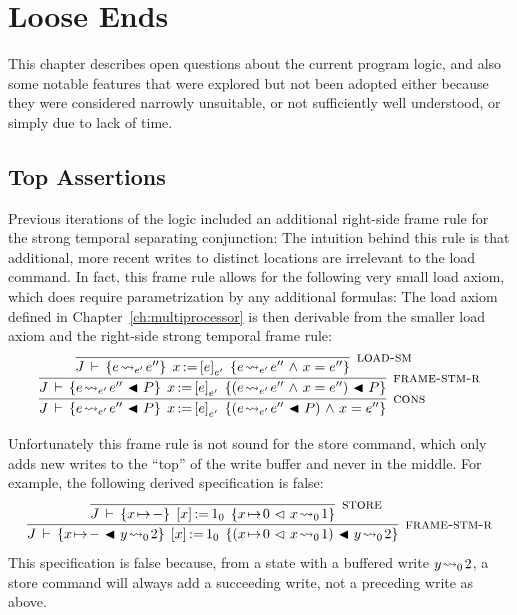 \documentclass[11pt]{report}         %
\begin{document}
\chapter{Loose Ends}

This chapter describes open questions about the current program logic, and also some notable features that were explored but not been adopted either because they were considered narrowly unsuitable, or not sufficiently well understood, or simply due to lack of time. 

\section{Top Assertions}
\label{sec:top-assertion}

Previous iterations of the logic included an additional right-side frame rule for the strong temporal separating conjunction:  The intuition behind this rule is that additional, more recent writes to distinct locations are irrelevant to the load command. In fact, this frame rule allows for the following very small load axiom, which does require parametrization by any additional formulas:  The load axiom defined in Chapter~\ref{ch:multiprocessor} is then derivable from the smaller load axiom and the right-side strong temporal frame rule: \[ \infer[\textsc{cons}]{\spec{J}{e \fwrite{e'} e'' \fsseq P}{\cload{x}{e}_{e'}}{(e \fwrite{e'} e'' \fsseq P) \conj x = e''}}{\infer[\textsc{frame-stm-r}]{\spec{J}{e \fwrite{e'} e'' \fsseq P}{\cload{x}{e}_{e'}}{(e \fwrite{e'} e'' \conj x = e'') \fsseq P }}{\infer[\textsc{load-sm}]{\spec{J}{e \fwrite{e'} e''}{\cload{x}{e}_{e'}}{e \fwrite{e'} e'' \conj x = e''}}{}}}\]

Unfortunately this frame rule is not sound for the store command, which only adds new writes to the ``top'' of the write buffer and never in the middle. For example, the following derived specification is false: \[ \infer[\textsc{frame-stm-r}]{\spec{J}{x \fpointsto - \fsseq y \fwrite{0} 2}{\cstore{x}{1}_0}{(x \fpointsto 0 \fseq x \fwrite{0} 1) \fsseq y \fwrite{0} 2}}{\infer[\textsc{store}]{\spec{J}{x \fpointsto - }{\cstore{x}{1}_0}{x \fpointsto 0 \fseq x \fwrite{0} 1}}{}}\] This specification is false because, from a state with a buffered write $y \!\leadsto_{0}\! 2$, a store command will always add a succeeding write, not a preceding write as above. 
\end{document}
